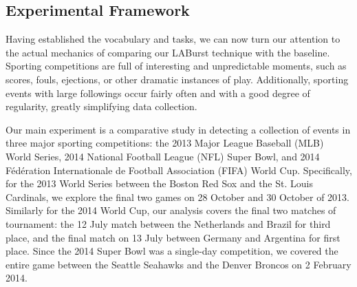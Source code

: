 \documentclass{sig-alternate}
\newcommand{\red}[1]{\textcolor{red}{#1}}
\begin{document}
\subsection{Experimental Framework}



Having established the vocabulary and tasks, we can now turn our attention to the actual mechanics of comparing our LABurst technique with the baseline.
Sporting competitions are full of interesting and unpredictable moments, such as scores, fouls, ejections, or other dramatic instances of play.
Additionally, sporting events with large followings occur fairly often and with a good degree of regularity, greatly simplifying data collection.

Our main experiment is a comparative study in detecting a collection of events in three major sporting competitions: the 2013 Major League Baseball (MLB) World Series, 2014 National Football League (NFL) Super Bowl, and 2014 F\'{e}d\'{e}ration Internationale de Football Association (FIFA) World Cup.
Specifically, for the 2013 World Series between the Boston Red Sox and the St. Louis Cardinals, we explore the final two games on 28 October and 30 October of 2013.
Similarly for the 2014 World Cup, our analysis covers the final two matches of tournament: the 12 July match between the Netherlands and Brazil for third place, and the final match on 13 July between Germany and Argentina for first place.
Since the 2014 Super Bowl was a single-day competition, we covered the entire game between the Seattle Seahawks and the Denver Broncos on 2 February 2014.
\end{document}
